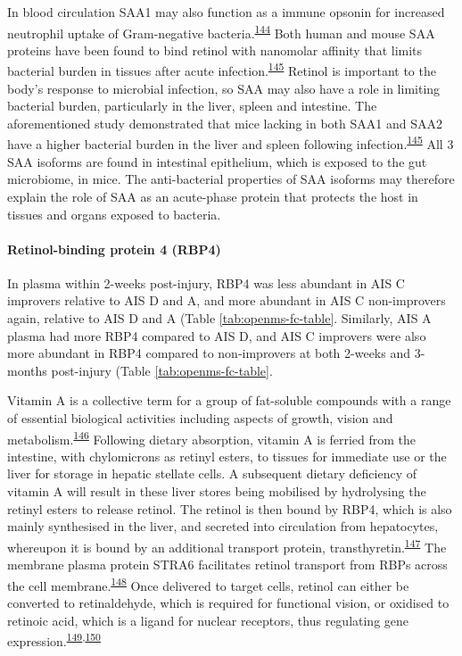 \documentclass[
]{article}
\begin{document}
In blood circulation SAA1 may also function as a immune opsonin for increased neutrophil uptake of Gram-negative bacteria.\textsuperscript{\protect\hyperlink{ref-shah_serum_2006}{144}}
Both human and mouse SAA proteins have been found to bind retinol with nanomolar affinity that limits bacterial burden in tissues after acute infection.\textsuperscript{\protect\hyperlink{ref-derebe_serum_2014}{145}}
Retinol is important to the body's response to microbial infection, so SAA may also have a role in limiting bacterial burden, particularly in the liver, spleen and intestine.
The aforementioned study demonstrated that mice lacking in both SAA1 and SAA2 have a higher bacterial burden in the liver and spleen following infection.\textsuperscript{\protect\hyperlink{ref-derebe_serum_2014}{145}}
All 3 SAA isoforms are found in intestinal epithelium, which is exposed to the gut microbiome, in mice.
The anti-bacterial properties of SAA isoforms may therefore explain the role of SAA as an acute-phase protein that protects the host in tissues and organs exposed to bacteria.

\hypertarget{retinol-binding-protein-4-rbp4}{%
\paragraph{Retinol-binding protein 4 (RBP4)}\label{retinol-binding-protein-4-rbp4}}

In plasma within 2-weeks post-injury, RBP4 was less abundant in AIS C improvers relative to AIS D and A, and more abundant in AIS C non-improvers again, relative to AIS D and A (Table \ref{tab:openms-fc-table}.
Similarly, AIS A plasma had more RBP4 compared to AIS D, and AIS C improvers were also more abundant in RBP4 compared to non-improvers at both 2-weeks and 3-months post-injury (Table \ref{tab:openms-fc-table}.

Vitamin A is a collective term for a group of fat-soluble compounds with a range of essential biological activities including aspects of growth, vision and metabolism.\textsuperscript{\protect\hyperlink{ref-blomhoff_overview_2006}{146}}
Following dietary absorption, vitamin A is ferried from the intestine, with chylomicrons as retinyl esters, to tissues for immediate use or the liver for storage in hepatic stellate cells.
A subsequent dietary deficiency of vitamin A will result in these liver stores being mobilised by hydrolysing the retinyl esters to release retinol.
The retinol is then bound by RBP4, which is also mainly synthesised in the liver, and secreted into circulation from hepatocytes, whereupon it is bound by an additional transport protein, transthyretin.\textsuperscript{\protect\hyperlink{ref-peterson_studies_1971}{147}}
The membrane plasma protein STRA6 facilitates retinol transport from RBPs across the cell membrane.\textsuperscript{\protect\hyperlink{ref-berry_cross_2012}{148}}
Once delivered to target cells, retinol can either be converted to retinaldehyde, which is required for functional vision, or oxidised to retinoic acid, which is a ligand for nuclear receptors, thus regulating gene expression.\textsuperscript{\protect\hyperlink{ref-lane_role_2005}{149},\protect\hyperlink{ref-balmer_gene_2002}{150}}
\end{document}
